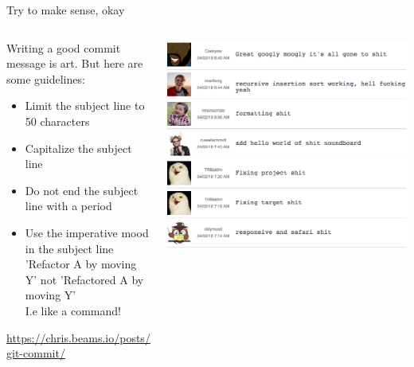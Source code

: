 \documentclass[10pt]{beamer}
\begin{document}
\begin{frame}[fragile]{Try to make sense, okay}
  \begin{columns}[T] %
     \begin{column}[T]{.5\textwidth} %
      Writing a good commit message is art.
      But here are some guidelines:

      \begin{itemize}
        \item Limit the subject line to 50 characters
        \item Capitalize the subject line
        \item Do not end the subject line with a period
        \item Use the imperative mood in the subject line\\
          'Refactor A by moving Y' not 'Refactored A by moving Y'\\
          I.e like a command!
      \end{itemize}

      \url{https://chris.beams.io/posts/git-commit/}
     \end{column}
     \begin{column}[T]{.5\textwidth} %
      \includegraphics[width=\textwidth]{commit-logs}

     \end{column}
   \end{columns}

\end{frame}
\end{document}
